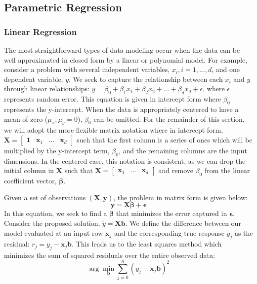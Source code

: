 \subsection{Parametric Regression}
\subsubsection{Linear Regression}
The most straightforward types of data modeling occur when the data can be well approximated in closed form by a linear or polynomial model.
%
For example, consider a problem with several independent variables, $x_i, i=1,...,d$, and one dependent variable, $y$.
%
We seek to capture the relationship between each $x_i$ and $y$ through linear relationships: $y = \beta_0 + \beta_1 x_1 + \beta_2 x_2 + ... + \beta_d x_d + \epsilon$, where $\epsilon$ represents random error.
%
This equation is given in intercept form where $\beta_0$ represents the y-intercept.
%
When the data is appropriately centered to have a mean of zero ($\mu_x,\mu_y = 0$), $\beta_0$ can be omitted.
%
For the remainder of this section, we will adopt the more flexible matrix notation where in intercept form, $\mathbf{X} = \begin{bmatrix}\mathbf{1} & \mathbf{x}_1 & \ldots & \mathbf{x}_d \end{bmatrix}$ such that the first column is a series of ones which will be multiplied by the y-intercept term, $\beta_0$, and the remaining columns are the input dimensions.
%
In the centered case, this notation is consistent, as we can drop the initial column in $\mathbf{X}$ such that $\mathbf{X} = \begin{bmatrix}\mathbf{x}_1 & \ldots & \mathbf{x}_d\end{bmatrix}$ and remove $\beta_0$ from the linear coefficient vector, $\boldsymbol\beta$.

Given a set of observations $(\mathbf{X},\mathbf{y})$, the problem in matrix form is given below:
%
\begin{equation}
\mathbf{y} = \mathbf{X}\boldsymbol\beta + \boldsymbol\epsilon
\end{equation}
%
In this equation, we seek to find a $\boldsymbol\beta$ that minimizes the error captured in $\boldsymbol\epsilon$.
%
Consider the proposed solution, $\tilde{y} = \mathbf{X}\mathbf{b}$.
%
We define the difference between our model evaluated at an input row $\mathbf{x}_j$ and the corresponding true response $y_j$ as the residual: $r_j = y_j - \mathbf{x}_j\mathbf{b}$.
%
This leads us to the least squares method which minimizes the sum of squared residuals over the entire observed data:
\begin{equation}
\arg\min_{\mathbf{b}} \sum_{j=0}^n(y_j - \mathbf{x}_j\mathbf{b})^2
\end{equation}

